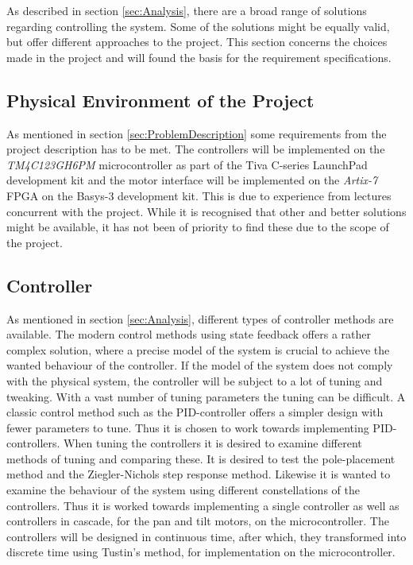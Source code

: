 \documentclass[../../main.tex]{subfiles}
\begin{document}
As described in section \ref{sec:Analysis}, there are a broad range of solutions regarding controlling the system. Some of the solutions might be equally valid, but offer different approaches to the project. This section concerns the choices made in the project and will found the basis for the requirement specifications.

\subsection*{Physical Environment of the Project}
As mentioned in section \ref{sec:ProblemDescription} some requirements from the project description has to be met. The controllers will be implemented on the \textit{TM4C123GH6PM} microcontroller as part of the Tiva C-series LaunchPad development kit and the motor interface will be implemented on the \textit{Artix-7} FPGA on the Basys-3 development kit. This is due to experience from lectures concurrent with the project. While it is recognised that other and better solutions might be available, it has not been of priority to find these due to the scope of the project. 



\subsection*{Controller}
As mentioned in section \ref{sec:Analysis}, different types of controller methods are available. The modern control methods using state feedback offers a rather complex solution, where a precise model of the system is crucial to achieve the wanted behaviour of the controller. If the model of the system does not comply with the physical system, the controller will be subject to a lot of tuning and tweaking. With a vast number of tuning parameters the tuning can be difficult. A classic control method such as the PID-controller offers a simpler design with fewer parameters to tune. Thus it is chosen to work towards implementing PID-controllers. When tuning the controllers it is desired to examine different methods of tuning and comparing these. It is desired to test the pole-placement method and the Ziegler-Nichols step response method. Likewise it is wanted to examine the behaviour of the system using different constellations of the controllers. Thus it is worked towards implementing a single controller as well as controllers in cascade, for the pan and tilt motors, on the microcontroller. 
The controllers will be designed in continuous time, after which, they transformed into discrete time using Tustin's method, for implementation on the microcontroller. 
\end{document}
